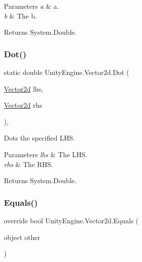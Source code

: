 \begin{DoxyParams}{Parameters}
{\em a} & a.\\
\hline
{\em b} & The b.\\
\hline
\end{DoxyParams}
\begin{DoxyReturn}{Returns}
System.\+Double.
\end{DoxyReturn}
\mbox{\label{struct_unity_engine_1_1_vector2d_a0e097e6f478e4a1b7c4d5760e5909ec7}} 
\subsubsection{\texorpdfstring{Dot()}{Dot()}}
{\footnotesize\ttfamily static double Unity\+Engine.\+Vector2d.\+Dot (\begin{DoxyParamCaption}\item[{\hyperlink{struct_unity_engine_1_1_vector2d}{Vector2d}}]{lhs,  }\item[{\hyperlink{struct_unity_engine_1_1_vector2d}{Vector2d}}]{rhs }\end{DoxyParamCaption})\hspace{0.3cm}{\ttfamily [inline]}, {\ttfamily [static]}}



Dots the specified L\+HS. 


\begin{DoxyParams}{Parameters}
{\em lhs} & The L\+HS.\\
\hline
{\em rhs} & The R\+HS.\\
\hline
\end{DoxyParams}
\begin{DoxyReturn}{Returns}
System.\+Double.
\end{DoxyReturn}
\mbox{\label{struct_unity_engine_1_1_vector2d_ac2d4ae49abb2a99ca46344e9bce0afcb}} 
\subsubsection{\texorpdfstring{Equals()}{Equals()}}
{\footnotesize\ttfamily override bool Unity\+Engine.\+Vector2d.\+Equals (\begin{DoxyParamCaption}\item[{object}]{other }\end{DoxyParamCaption})\hspace{0.3cm}{\ttfamily [inline]}}



